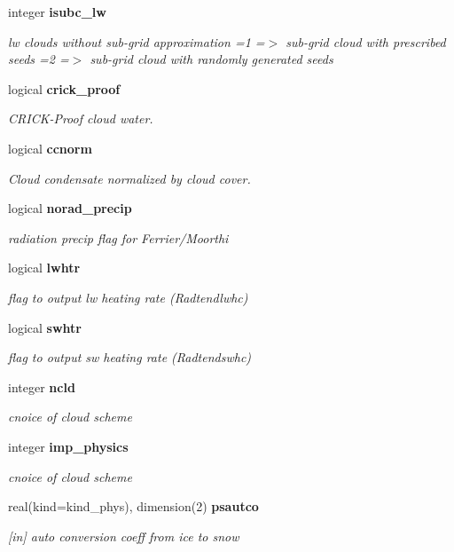 \begin{DoxyCompactItemize}
integer \textbf{ isubc\+\_\+lw}
\begin{DoxyCompactList}\small\item\em lw clouds without sub-\/grid approximation =1 =$>$ sub-\/grid cloud with prescribed seeds =2 =$>$ sub-\/grid cloud with randomly generated seeds \end{DoxyCompactList}\item 
logical \textbf{ crick\+\_\+proof}
\begin{DoxyCompactList}\small\item\em C\+R\+I\+C\+K-\/\+Proof cloud water. \end{DoxyCompactList}\item 
logical \textbf{ ccnorm}
\begin{DoxyCompactList}\small\item\em Cloud condensate normalized by cloud cover. \end{DoxyCompactList}\item 
logical \textbf{ norad\+\_\+precip}
\begin{DoxyCompactList}\small\item\em radiation precip flag for Ferrier/\+Moorthi \end{DoxyCompactList}\item 
logical \textbf{ lwhtr}
\begin{DoxyCompactList}\small\item\em flag to output lw heating rate (Radtendlwhc) \end{DoxyCompactList}\item 
logical \textbf{ swhtr}
\begin{DoxyCompactList}\small\item\em flag to output sw heating rate (Radtendswhc) \end{DoxyCompactList}\item 
integer \textbf{ ncld}
\begin{DoxyCompactList}\small\item\em cnoice of cloud scheme \end{DoxyCompactList}\item 
integer \textbf{ imp\+\_\+physics}
\begin{DoxyCompactList}\small\item\em cnoice of cloud scheme \end{DoxyCompactList}\item 
real(kind=kind\+\_\+phys), dimension(2) \textbf{ psautco}
\begin{DoxyCompactList}\small\item\em [in] auto conversion coeff from ice to snow \end{DoxyCompactList}\item 

\end{DoxyCompactItemize}
